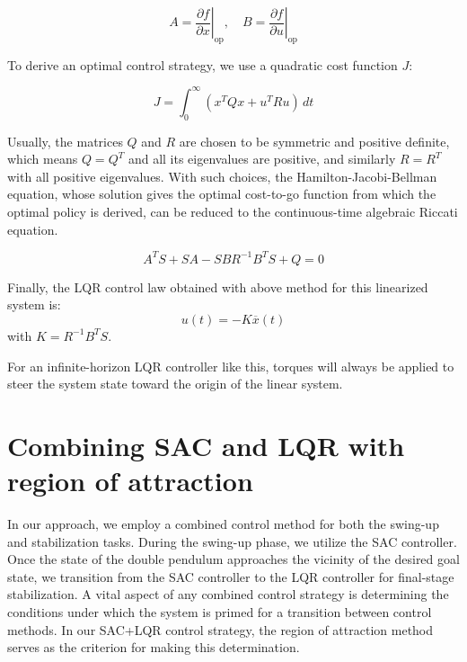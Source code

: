 \begin{equation}
 A = \left.\frac{\partial f}{\partial x}\right|_{\text{op}}, \quad B = \left.\frac{\partial f}{\partial u}\right|_{\text{op}}
\end{equation}


To derive an optimal control strategy, we use a quadratic cost function \(J\):

\begin{equation}
  J = \int_0^{\infty} \left( x^T Q x + u^T R u \right) \, dt
\end{equation}

Usually, the matrices \(Q\) and \(R\) are chosen to be symmetric and positive definite, which means \(Q = Q^T\) and all its eigenvalues are positive, and similarly \(R = R^T\) with all positive eigenvalues. With such choices, the Hamilton-Jacobi-Bellman equation, whose solution gives the optimal cost-to-go function from which the optimal policy is derived, can be reduced to the continuous-time algebraic Riccati equation.

\begin{equation}
 A^T S + SA - SBR^{-1}B^T S + Q = 0
\end{equation}

Finally, the LQR control law obtained with above method for this linearized system is:
\begin{equation}
 u(t) = -K\overline{x}(t)
\end{equation}
with \(K = R^{-1}B^T S\).

For an infinite-horizon LQR controller like this, torques will always be applied to steer the system state toward the origin of the linear system.


\section{Combining SAC and LQR with region of attraction}
In our approach, we employ a combined control method for both the swing-up and stabilization tasks. During the swing-up phase, we utilize the SAC controller. Once the state of the double pendulum approaches the vicinity of the desired goal state, we transition from the SAC controller to the LQR controller for final-stage stabilization. A vital aspect of any combined control strategy is determining the conditions under which the system is primed for a transition between control methods. In our SAC+LQR control strategy, the region of attraction method serves as the criterion for making this determination.

